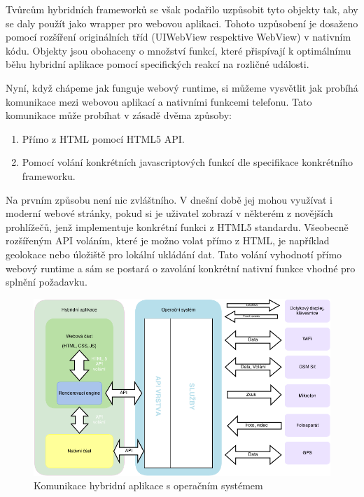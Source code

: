 Tvůrcům hybridních frameworků se však podařilo uzpůsobit tyto objekty tak, aby se daly použít jako wrapper pro webovou aplikaci. Tohoto uzpůsobení je dosaženo pomocí rozšíření originálních tříd (UIWebView respektive WebView) v nativním kódu. Objekty jsou obohaceny o množství funkcí, které přispívají k optimálnímu běhu hybridní aplikace pomocí specifických reakcí na rozličné události.

Nyní, když chápeme jak funguje webový runtime, si můžeme vysvětlit jak probíhá komunikace mezi webovou aplikací a nativními funkcemi telefonu. Tato komunikace může probíhat v zásadě dvěma způsoby:

\begin{enumerate}
	\item Přímo z HTML pomocí HTML5 API.
	\item Pomocí volání konkrétních javascriptových funkcí dle specifikace konkrétního frameworku.
\end{enumerate}

Na prvním způsobu není nic zvláštního. V dnešní době jej mohou využívat i moderní webové stránky, pokud si je uživatel zobrazí v některém z novějších prohlížečů, jenž implementuje konkrétní funkci z HTML5 standardu. Všeobecně rozšířeným API voláním, které je možno volat přímo z HTML, je například geolokace nebo úložiště pro lokální ukládání dat. Tato volání vyhodnotí přímo webový runtime a sám se postará o zavolání konkrétní nativní funkce vhodné pro splnění požadavku.

\begin{figure}\centering
\includegraphics[width=1.0\textwidth]{hybridni_aplikace_komunikace.png}
\caption{Komunikace hybridní aplikace s operačním systémem}
\label{fig:HybridAppCommunication}
\end{figure} 

